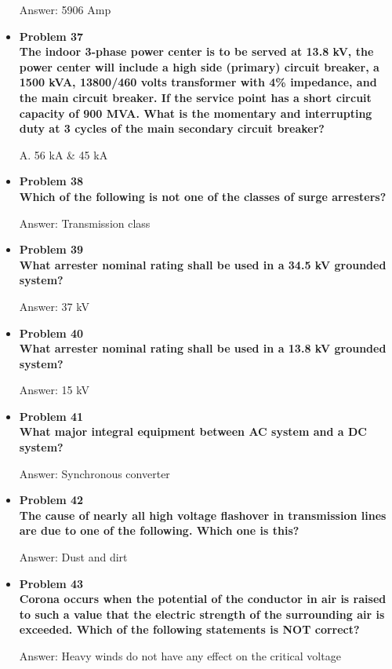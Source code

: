 \documentclass{article}
\begin{document}
\begin{center}
\begin{itemize}
    Answer: 5906 Amp

    \item\textbf{Problem 37\\
    The indoor 3-phase power center is to be served at 13.8 kV, the power center will include a high side (primary) circuit breaker, a 1500 kVA, 13800/460 volts transformer with 4\% impedance, and the main circuit breaker. If the service point has a short circuit capacity of 900 MVA. What is the momentary and interrupting duty at 3 cycles of the main secondary circuit breaker?}

    A. 56 kA \& 45 kA

    \item\textbf{Problem 38\\
    Which of the following is not one of the classes of surge arresters?}

    Answer: Transmission class

    \item\textbf{Problem 39\\
    What arrester nominal rating shall be used in a 34.5 kV grounded system?}

    Answer: 37 kV

    \item\textbf{Problem 40\\
    What arrester nominal rating shall be used in a 13.8 kV grounded system?}

    Answer: 15 kV  

    \item\textbf{Problem 41\\
    What major integral equipment between AC system and a DC system?}

    Answer: Synchronous converter

    \item\textbf{Problem 42\\
    The cause of nearly all high voltage flashover in transmission lines are due to one of the following. Which one is this?}

    Answer: Dust and dirt

    \item\textbf{Problem 43\\
    Corona occurs when the potential of the conductor in air is raised to such a value that the electric strength of the surrounding air is exceeded. Which of the following statements is NOT correct?}

    Answer: Heavy winds do not have any effect on the critical voltage


\end{itemize}
\end{center}
\end{document}
